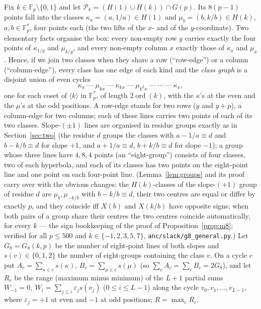 \documentclass[11pt]{article}
\theoremstyle{remark}
\newcommand{\Fp}{\mathbb{F}_p}
\newcommand{\Gp}{G(p)}
\newcommand{\Pset}{\mathcal{P}}
\begin{document}
Fix $k\in\Fp\setminus\{0,1\}$ and let $\Pset_k=(H(1)\cup H(k))\cap\Gp$.  Its $8(p-1)$ points fall into the classes
$\kappa_a=(a,1/a)\in H(1)$ and $\mu_b=(b,k/b)\in H(k)$, $a,b\in\Fp^*$, four points each (the two lifts of the $x$- and of the
$y$-coordinate).  Two elementary facts organise the box: every non-empty row $y$ carries exactly the four points of $\kappa_{1/y}$ and
$\mu_{k/y}$, and every non-empty column $x$ exactly those of $\kappa_x$ and $\mu_x$.  Hence, if we join two classes when they share a row
(``row-edge'') or a column (``column-edge''), every class has one edge of each kind and the \emph{class graph} is a disjoint union of even
cycles
\[
 \kappa_x\ \text{---}\ \mu_{kx}\ \text{---}\ \kappa_{kx}\ \text{---}\ \mu_{k^2x}\ \text{---}\ \cdots\ \text{---}\ \kappa_x ,
\]
one for each coset of $\langle k\rangle$ in $\Fp^*$, of length $2\operatorname{ord}(k)$, with the $\kappa$'s at the even and the $\mu$'s at
the odd positions.  A row-edge stands for two rows ($y$ and $y+p$), a column-edge for two columns; each of these lines carries two points of
each of its two classes.  Slope-$(\pm1)$ lines are organised in residue groups exactly as in Section~\ref{sec:two} (the residue $d$ groups the
classes with $a-1/a\equiv d$ and $b-k/b\equiv d$ for slope $+1$, and $a+1/a\equiv d$, $b+k/b\equiv d$ for slope $-1$); a group whose three
lines have $4,8,4$ points (an ``eight-group'') consists of four classes, two of each hyperbola, and each of its classes has two points on the
eight-point line and one point on each four-point line.  (Lemma~\ref{lem:groups} and its proof carry over with the obvious changes: the $H(k)$-classes of the slope-$(+1)$ group of residue
$d$ are $\mu_b,\mu_{-k/b}$ with $b-k/b\equiv d$, their two centres are equal or differ by exactly $p$, and they coincide iff $X(b)$ and
$X(k/b)$ have opposite signs; when both pairs of a group share their centres the two centres coincide automatically, for every $k$ ---
the sign bookkeeping of the proof of Proposition~\ref{prop:m8}; verified for all $p\le500$ and $k\in\{-1,2,3,5,7\}$, \texttt{anc/slack/g8\_general.py}.)  Let
$G_8=G_8(k,p)$ be the number of eight-point lines of both slopes and $s(v)\in\{0,1,2\}$ the number of eight-groups containing the class $v$.
On a cycle $c$ put $A_c=\sum_{\kappa\in c}s(\kappa)$, $B_c=\sum_{\mu\in c}s(\mu)$ (so $\sum_cA_c=\sum_cB_c=2G_8$), and let $R_c$ be the range
(maximum minus minimum) of the $L+1$ partial sums $W_{-1}=0,\ W_i=\sum_{j\le i}\varepsilon_js(v_j)$ ($0\le i\le L-1$) along the cycle
$v_0,v_1,\dots,v_{L-1}$, where $\varepsilon_j=+1$ at even and $-1$ at odd positions; $R=\max_cR_c$.
\end{document}
